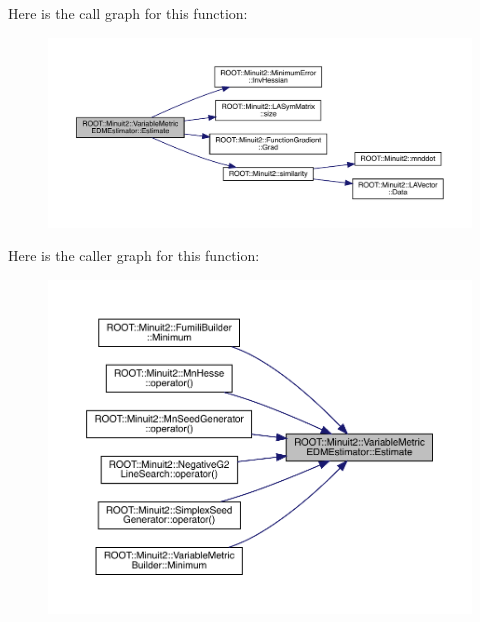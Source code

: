 Here is the call graph for this function\+:\nopagebreak
\begin{figure}[H]
\begin{center}
\leavevmode
\includegraphics[width=350pt]{d7/de3/classROOT_1_1Minuit2_1_1VariableMetricEDMEstimator_a3c4d22f40ab9ea39de88cca47ddfcb5f_cgraph}
\end{center}
\end{figure}
Here is the caller graph for this function\+:\nopagebreak
\begin{figure}[H]
\begin{center}
\leavevmode
\includegraphics[width=350pt]{d7/de3/classROOT_1_1Minuit2_1_1VariableMetricEDMEstimator_a3c4d22f40ab9ea39de88cca47ddfcb5f_icgraph}
\end{center}
\end{figure}
\mbox{\label{classROOT_1_1Minuit2_1_1VariableMetricEDMEstimator_a3c4d22f40ab9ea39de88cca47ddfcb5f}} 
